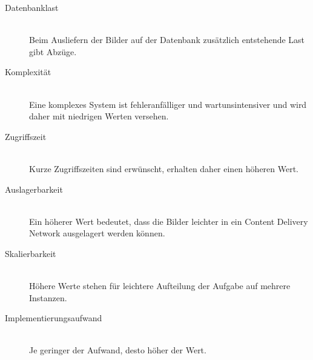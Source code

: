 \begin{description}
  \item[Datenbanklast] \mbox{} \\ Beim Ausliefern der Bilder auf der Datenbank
    zusätzlich entstehende Last gibt Abzüge.
  \item[Komplexität] \mbox{} \\ Eine komplexes System ist fehleranfälliger und
    wartunsintensiver und wird daher mit niedrigen Werten versehen.
  \item[Zugriffszeit] \mbox{} \\ Kurze Zugriffszeiten sind erwünscht, erhalten
    daher einen höheren Wert.
  \item[Auslagerbarkeit] \mbox{} \\ Ein höherer Wert bedeutet, dass die Bilder
    leichter in ein Content Delivery Network ausgelagert werden können.
  \item[Skalierbarkeit] \mbox{} \\ Höhere Werte stehen für leichtere Aufteilung
    der Aufgabe auf mehrere Instanzen.
  \item[Implementierungsaufwand] \mbox{} \\ Je geringer der Aufwand, desto höher
    der Wert.
\end{description}

